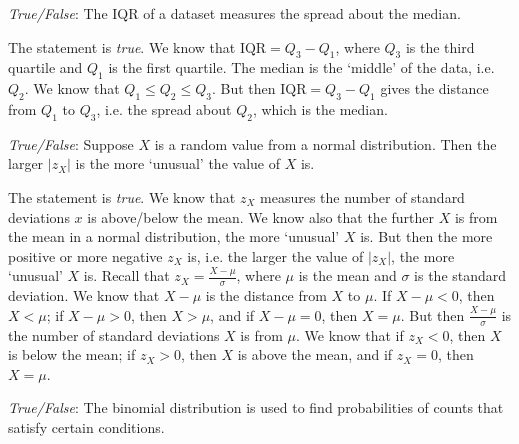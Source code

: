 \documentclass[11pt,letterpaper]{article}
\begin{document}
\quizsol \textit{True/False}: The IQR of a dataset measures the spread about the median. \pspace

\sol The statement is \textit{true}. We know that $\text{IQR}= Q_3 - Q_1$, where $Q_3$ is the third quartile and $Q_1$ is the first quartile. The median is the `middle' of the data, i.e. $Q_2$. We know that $Q_1 \leq Q_2 \leq Q_3$. But then $\text{IQR}= Q_3 - Q_1$ gives the distance from $Q_1$ to $Q_3$, i.e. the spread about $Q_2$, which is the median. \pvspace{1.3cm}



\quizsol \textit{True/False}: Suppose $X$ is a random value from a normal distribution. Then the larger $|z_X|$ is the more `unusual' the value of $X$ is. \pspace

\sol The statement is \textit{true}. We know that $z_X$ measures the number of standard deviations $x$ is above/below the mean. We know also that the further $X$ is from the mean in a normal distribution, the more `unusual' $X$ is. But then the more positive or more negative $z_X$ is, i.e. the larger the value of $|z_X|$, the more `unusual' $X$ is. Recall that $z_X= \frac{X - \mu}{\sigma}$, where $\mu$ is the mean and $\sigma$ is the standard deviation. We know that $X - \mu$ is the distance from $X$ to $\mu$. If $X - \mu < 0$, then $X < \mu$; if $X - \mu > 0$, then $X > \mu$, and if $X - \mu= 0$, then $X = \mu$. But then $\frac{X - \mu}{\sigma}$ is the number of standard deviations $X$ is from $\mu$. We know that if $z_X < 0$, then $X$ is below the mean; if $z_X > 0$, then $X$ is above the mean, and if $z_X = 0$, then $X = \mu$. \pvspace{1.3cm}



\quizsol \textit{True/False}: The binomial distribution is used to find probabilities of counts that satisfy certain conditions. \pspace
\end{document}
